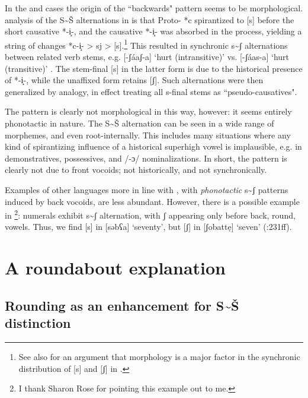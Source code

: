 In the  and  cases the origin of the ``backwards" pattern seems to be morphological.  analysis of the S{\textasciitilde}Š alternations in  is that Proto- *c spirantized to [s] before the short causative *-i̝-, and the causative *-i̝- was absorbed in the process, yielding a string of changes *c-i̝- > sj > [s].\footnote{See also \citet{Bennett&Pulleyblank:2014} for an argument that morphology is a major factor in the synchronic distribution of [s] and [ʃ] in .} This resulted in synchronic s{\textasciitilde}ʃ alternations between related verb stems, e.g. [-ʃáaʃ-a] ‘hurt (intransitive)’ vs. [-ʃáas-a] ‘hurt (transitive)’ \citep[85]{Hyman2003b}. The stem-final [s] in the latter form is due to the historical presence of *-i̝-, while the unaffixed form retains [ʃ]. Such alternations were then generalized by analogy, in effect treating all s-final stems as ``pseudo-causatives".

The  pattern is clearly not morphological in this way, however: it seems entirely phonotactic in nature. The S{\textasciitilde}Š alternation can be seen in a wide range of morphemes, and even root-internally. This includes many situations where any kind of spirantizing influence of a historical superhigh vowel is implausible, e.g. in demonstratives, possessives, and /-ɔ/ nominalizations. In short, the  pattern is clearly not due to front vocoids; not historically, and not synchronically.

Examples of other languages more in line with , with \textit{phonotactic} s{\textasciitilde}ʃ patterns induced by back vocoids, are less abundant. However, there is a possible example in \footnote{I thank Sharon Rose for pointing this example out to me.}: numerals exhibit s{\textasciitilde}ʃ alternation, with ʃ appearing only before back, round, vowels. Thus, we find [s] in [səbʕa] ‘seventy’, but [ʃ] in [ʃobattẹ] ‘seven’ (\citealt{Banksira2000}:231ff). 

\section{A roundabout explanation}\label{sec:bennett:4}

\subsection{Rounding as an enhancement for S{\textasciitilde}Š distinction}\label{sec:bennett:4.1}

